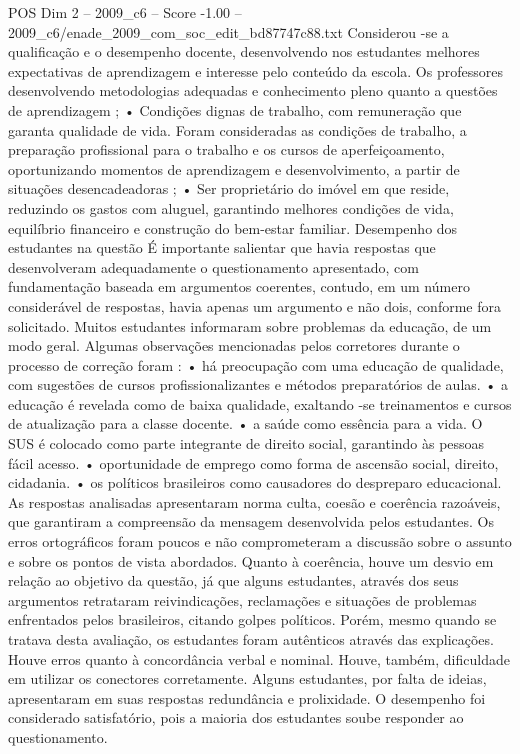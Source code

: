 \begin{textsample}{POS Dim 2 – 2009\_c6 – Score -1.00 – 2009\_c6/enade\_2009\_com\_soc\_edit\_bd87747c88.txt}
Considerou -se a qualificação e o desempenho docente, desenvolvendo nos estudantes melhores expectativas de aprendizagem e interesse pelo conteúdo da escola.
Os professores desenvolvendo metodologias adequadas e conhecimento pleno quanto a questões de aprendizagem ; • Condições dignas de trabalho, com remuneração que garanta qualidade de vida.
Foram consideradas as condições de trabalho, a preparação profissional para o trabalho e os cursos de aperfeiçoamento, oportunizando momentos de aprendizagem e desenvolvimento, a partir de situações desencadeadoras ; • Ser proprietário do imóvel em que reside, reduzindo os gastos com aluguel, garantindo melhores condições de vida, equilíbrio financeiro e construção do bem-estar familiar.
Desempenho dos estudantes na questão É importante salientar que havia respostas que desenvolveram adequadamente o questionamento apresentado, com fundamentação baseada em argumentos coerentes, contudo, em um número considerável de respostas, havia apenas um argumento e não dois, conforme fora solicitado.
Muitos estudantes informaram sobre problemas da educação, de um modo geral.
Algumas observações mencionadas pelos corretores durante o processo de correção foram : • há preocupação com uma educação de qualidade, com sugestões de cursos profissionalizantes e métodos preparatórios de aulas. • a educação é revelada como de baixa qualidade, exaltando -se treinamentos e cursos de atualização para a classe docente. • a saúde como essência para a vida.
O SUS é colocado como parte integrante de direito social, garantindo às pessoas fácil acesso. • oportunidade de emprego como forma de ascensão social, direito, cidadania. • os políticos brasileiros como causadores do despreparo educacional.
As respostas analisadas apresentaram norma culta, coesão e coerência razoáveis, que garantiram a compreensão da mensagem desenvolvida pelos estudantes.
Os erros ortográficos foram poucos e não comprometeram a discussão sobre o assunto e sobre os pontos de vista abordados.
Quanto à coerência, houve um desvio em relação ao objetivo da questão, já que alguns estudantes, através dos seus argumentos retrataram reivindicações, reclamações e situações de problemas enfrentados pelos brasileiros, citando golpes políticos.
Porém, mesmo quando se tratava desta avaliação, os estudantes foram autênticos através das explicações.
Houve erros quanto à concordância verbal e nominal.
Houve, também, dificuldade em utilizar os conectores corretamente.
Alguns estudantes, por falta de ideias, apresentaram em suas respostas redundância e prolixidade.
O desempenho foi considerado satisfatório, pois a maioria dos estudantes soube responder ao questionamento.

\end{textsample}
